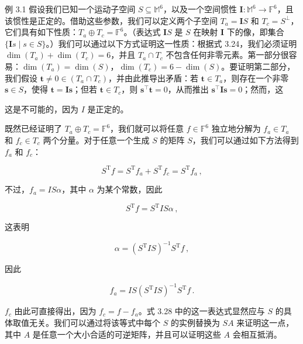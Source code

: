 \documentclass[10pt,a4paper]{book}
\theoremstyle{thmstyle} %
\theoremstyle{defstyle} %
\theoremstyle{prostyle} %
\begin{document}
例 3.1 假设我们已知一个运动子空间 $S \subseteq \mathbb{M}^6$，以及一个空间惯性 $\mathbf{I} : \mathbb{M}^6 \to \mathbb{F}^6$，且该惯性是正定的。借助这些参数，我们可以定义两个子空间 $T_a = \mathbf{I}S$ 和 $T_c = S^\perp$，它们具有如下性质：$T_a \oplus T_c = \mathbb{F}^6$。（表达式 $\mathbf{I}S$ 是 $S$ 在映射 $\mathbf{I}$ 下的像，即集合 $\{\mathbf{I}s \mid s \in S\}$。）我们可以通过以下方式证明这一性质：根据式 3.24，我们必须证明 $\dim(T_a) + \dim(T_c) = 6$，并且 $T_a \cap T_c$ 不包含任何非零元素。第一部分很容易：$\dim(T_a) = \dim(S)$，$\dim(T_c) = 6 - \dim(S)$。要证明第二部分，我们假设 $\mathbf{t} \neq 0 \in (T_a \cap T_c)$，并由此推导出矛盾：若 $\mathbf{t} \in T_a$，则存在一个非零 $\mathbf{s} \in S$，使得 $\mathbf{t} = \mathbf{I}\mathbf{s}$；但若 $\mathbf{t} \in T_c$，则 $\mathbf{s}^\top\mathbf{t} = 0$，从而推出 $\mathbf{s}^\top\mathbf{I}\mathbf{s} = 0$；然而，这



这是不可能的，因为 $I$ 是正定的。



既然已经证明了 $T_a \oplus T_c = \mathbb{F}^6$，我们就可以将任意 $f \in \mathbb{F}^6$ 独立地分解为 $f_a \in T_a$ 和 $f_c \in T_c$ 两个分量。对于任意一个生成 $S$ 的矩阵 $S$，我们可以通过如下方法得到 $f_a$ 和 $f_c$：



$$
S ^{\mathrm { T} } f = S ^{\mathrm { T} } f _ { a } + S ^{\mathrm { T} } f _ { c } = S ^{\mathrm { T} } f _ { a } \, ,
$$



不过，$f_{a} = IS\alpha$，其中 $\alpha$ 为某个常数，因此



$$
S ^{\mathrm { T} } f = S ^{\mathrm { T} } I S \alpha \, ,
$$



这表明



$$
\alpha = ( S ^{\mathrm { T} } I S ) ^{- 1} S ^{\mathrm { T} } f \, ,
$$



因此



$$
f _ { a } = I S ( S ^{\mathrm { T} } I S ) ^{- 1} S ^{\mathrm { T} } f \, .
$$



$f_{c}$ 由此可直接得出，因为 $f_{c}=f-f_{a}$。式 3.28 中的这一表达式显然应与 $S$ 的具体取值无关。我们可以通过将该等式中每个 $S$ 的实例替换为 $SA$ 来证明这一点，其中 $A$ 是任意一个大小合适的可逆矩阵，并且可以证明这些 $A$ 会相互抵消。
\end{document}
